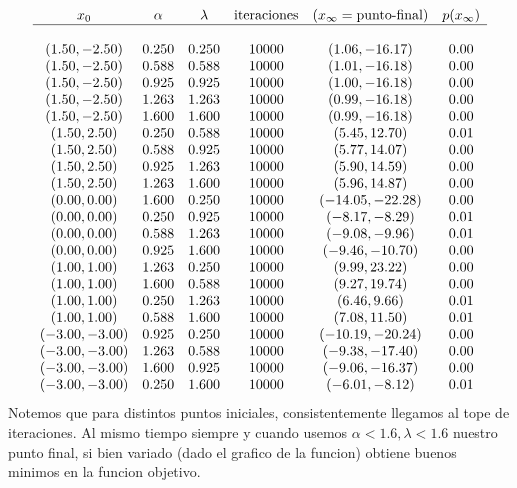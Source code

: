 \documentclass[letterpaper]{article}
\begin{document}
\[
\begin{array}{c c c c c c}
  x_0 & \alpha & \lambda & \text{iteraciones} &
        (x_{\infty} = \text{punto-final}) & p(x_{\infty}) \\
  \hline \\
  (1.50, -2.50)  & 0.250 & 0.250 & 10000 & (1.06, -16.17)   & 0.00 \\
  (1.50, -2.50)  & 0.588 & 0.588 & 10000 & (1.01, -16.18)   & 0.00 \\
  (1.50, -2.50)  & 0.925 & 0.925 & 10000 & (1.00, -16.18)   & 0.00 \\
  (1.50, -2.50)  & 1.263 & 1.263 & 10000 & (0.99, -16.18)   & 0.00 \\
  (1.50, -2.50)  & 1.600 & 1.600 & 10000 & (0.99, -16.18)   & 0.00 \\
  (1.50, 2.50)   & 0.250 & 0.588 & 10000 & (5.45, 12.70)    & 0.01 \\
  (1.50, 2.50)   & 0.588 & 0.925 & 10000 & (5.77, 14.07)    & 0.00 \\
  (1.50, 2.50)   & 0.925 & 1.263 & 10000 & (5.90, 14.59)    & 0.00 \\
  (1.50, 2.50)   & 1.263 & 1.600 & 10000 & (5.96, 14.87)    & 0.00 \\
  (0.00, 0.00)   & 1.600 & 0.250 & 10000 & (-14.05, -22.28) & 0.00 \\
  (0.00, 0.00)   & 0.250 & 0.925 & 10000 & (-8.17, -8.29)   & 0.01 \\
  (0.00, 0.00)   & 0.588 & 1.263 & 10000 & (-9.08, -9.96)   & 0.01 \\
  (0.00, 0.00)   & 0.925 & 1.600 & 10000 & (-9.46, -10.70)  & 0.00 \\
  (1.00, 1.00)   & 1.263 & 0.250 & 10000 & (9.99, 23.22)    & 0.00 \\
  (1.00, 1.00)   & 1.600 & 0.588 & 10000 & (9.27, 19.74)    & 0.00 \\
  (1.00, 1.00)   & 0.250 & 1.263 & 10000 & (6.46, 9.66)     & 0.01 \\
  (1.00, 1.00)   & 0.588 & 1.600 & 10000 & (7.08, 11.50)    & 0.01 \\
  (-3.00, -3.00) & 0.925 & 0.250 & 10000 & (-10.19, -20.24) & 0.00 \\
  (-3.00, -3.00) & 1.263 & 0.588 & 10000 & (-9.38, -17.40)  & 0.00 \\
  (-3.00, -3.00) & 1.600 & 0.925 & 10000 & (-9.06, -16.37)  & 0.00 \\
  (-3.00, -3.00) & 0.250 & 1.600 & 10000 & (-6.01, -8.12)   & 0.01 \\
\end{array}
\]
Notemos que para distintos puntos iniciales, consistentemente llegamos al
tope de iteraciones. Al mismo tiempo siempre y cuando usemos \(\alpha < 1.6,
\lambda < 1.6\) nuestro punto final, si bien variado (dado el grafico de
la funcion) obtiene buenos minimos en la funcion objetivo.
\end{document}
